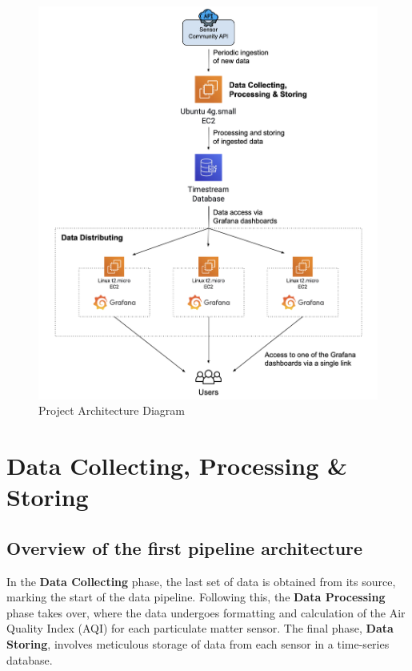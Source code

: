 \documentclass[12pt,oneside]{book} %
\begin{document}
\begin{figure}[H]
    \centering
    \includegraphics[width=1\linewidth]{images/pipeline.png}
    \caption{Project Architecture Diagram}\label{fig:project-pipeline}
\end{figure}

\newpage
\section{Data Collecting, Processing \& Storing}
\subsection{Overview of the first pipeline architecture}

In the \textbf{Data Collecting} phase, the last set of data is obtained from
its source, marking the start of the data pipeline. Following this, the
\textbf{Data Processing} phase takes over, where the data undergoes formatting
and calculation of the Air Quality Index (AQI) for each particulate matter
sensor. The final phase, \textbf{Data Storing}, involves meticulous storage of
data from each sensor in a time-series database.
\end{document}

